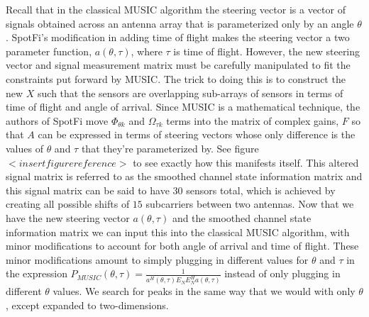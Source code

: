 \documentclass[12pt]{report}
\begin{document}
Recall that in the classical MUSIC algorithm the steering vector is a vector of signals obtained across an antenna array that is parameterized only by an angle $\theta$. SpotFi's modification in adding time of flight makes the steering vector a two parameter function, $a(\theta, \tau)$, where $\tau$ is time of flight. However, the new steering vector and signal measurement matrix must be carefully manipulated to fit the constraints put forward by MUSIC. The trick to doing this is to construct the new $X$ such that the sensors are overlapping sub-arrays of sensors in terms of time of flight and angle of arrival. Since MUSIC is a mathematical technique, the authors of SpotFi move $\Phi_{\theta k}$ and $\Omega_{\tau k}$ terms into the matrix of complex gains, $F$ so that $A$ can be expressed in terms of steering vectors whose only difference is the values of $\theta$ and $\tau$ that they're parameterized by. See figure $<insert figure reference>$ to see exactly how this manifests itself. This altered signal matrix is referred to as the smoothed channel state information matrix and this signal matrix can be said to have $30$ sensors total, which is achieved by creating all possible shifts of $15$ subcarriers between two antennas. Now that we have the new steering vector $a(\theta, \tau)$ and the smoothed channel state information matrix we can input this into the classical MUSIC algorithm, with minor modifications to account for both angle of arrival and time of flight. These minor modifications amount to simply plugging in different values for $\theta$ and $\tau$ in the expression $P_{MUSIC}(\theta, \tau) = \frac{1}{a^{H}(\theta, \tau) E_{N} E^{H}_{N} a(\theta, \tau)}$ instead of only plugging in different $\theta$ values. We search for peaks in the same way that we would with only $\theta$, except expanded to two-dimensions. \par
\end{document}
